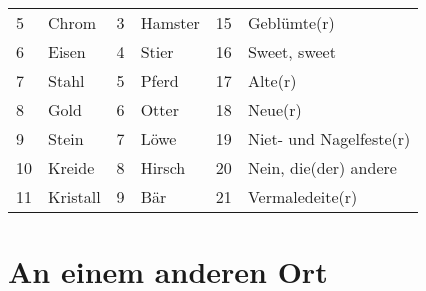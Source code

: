 \documentclass[final]{multiversum}
\begin{document}
\begin{table*}[!t]
\begin{framed}
\begin{tabular}{p{}p{}p{}p{}p{}p{}}
5             & Chrom             	           & 3               & Hamster                & 15              & Geblümte(r)            \\
6             & Eisen                          & 4               & Stier                  & 16              & Sweet, sweet           \\
7             & Stahl                          & 5               & Pferd                  & 17              & Alte(r)                \\
8             & Gold                           & 6               & Otter                  & 18              & Neue(r)                \\
9             & Stein                          & 7               & Löwe                   & 19              & Niet- und Nagelfeste(r)\\
10            & Kreide                         & 8               & Hirsch                 & 20              & Nein, die(der) andere  \\
11            & Kristall                       & 9               & Bär                    & 21              & Vermaledeite(r)        \\
\end{tabular}
\end{framed}
\end{table*}


\section{An einem anderen Ort}
\end{document}
